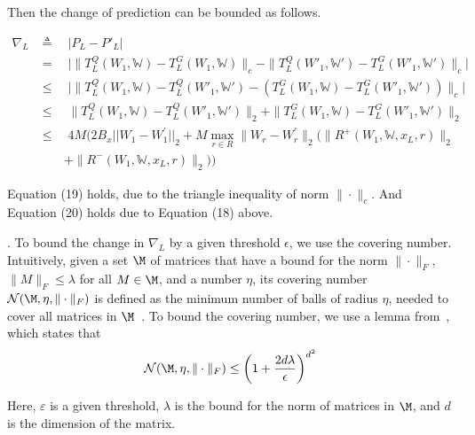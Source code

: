 Then the change of prediction can be bounded as follows.

\begin{scriptsize}
\begin{align*}
		\nabla_{L} & \triangleq \quad |P_L - P'_L|\\
		& =\quad\bigg|\|T^Q_{L}(W_{1},\mathds{W})-T^G_{L}(W_{1},
		\mathds{W})\|_c - \|T^Q_{L}(W'_{1},\mathds{W}')-T^G_{L}(W'_{1},
		\mathds{W}')\|_c\bigg| \\
		& \leq \quad\bigg|\|T^Q_{L}(W_{1},\mathds{W})-T^Q_{L}(W'_{1},
		\mathds{W}')-  (T^G_{L}(W_{1},
		\mathds{W})-T^G_{L}(W'_{1},
\mathds{W}'))\|_c\bigg| \tag{19}\\
		& \leq \quad\|T^Q_{L}(W_{1},\mathds{W})-T^Q_{L}(W'_{1},
\mathds{W}')\|_2 +
\|T^G_{L}(W_{1},
\mathds{W})-T^G_{L}(W'_{1},
\mathds{W}')\|_2 \\
&\leq \quad 4M \bigg(2B_{x}||W_{1}-W_{1}^{\prime}||_{2}+M\max_{r\in R}\|W_r-
W_r^{\prime}\|_2(\|R^+(W_1,\mathds{W},x_L,r)\|_2\\
&\quad\quad+\|R^-(W_1,\mathds{W},x_L,r)\|_2)\bigg)\tag{20}
\end{align*}
\end{scriptsize}


Equation (19) holds, due to the triangle inequality 
of norm $\|\cdot\|_c$.
And Equation (20) holds due to Equation (18) above.


.
To bound the change in $\nabla_{L}$ by 
a given threshold $\epsilon$, we use the covering number.
Intuitively, given a set $\M$ of matrices
that have a bound for the norm $\|\cdot\|_F$,
\ie $\|M\|_F\leq \lambda$ for all $M\in \M$,
and a number $\eta$, its covering 
number ${\mathcal N}(\M, \eta, \|\cdot\|_F)$ is defined as the minimum number
of balls of radius $\eta$, needed to cover
all matrices in $\M$~\cite{Covering-number}.
To bound the covering number, 
we use a lemma from~\cite{Covering-1}, 
which states that 
$${\mathcal N}(\M, \eta, \|\cdot\|_F)\leq \bigg(1+\frac{2d\lambda}{\epsilon}\bigg)^{d^2}$$

Here, $\varepsilon$ is a given threshold, $\lambda$
is the bound for the norm of matrices in $\M$, 
and $d$ is the dimension 
of the matrix.

